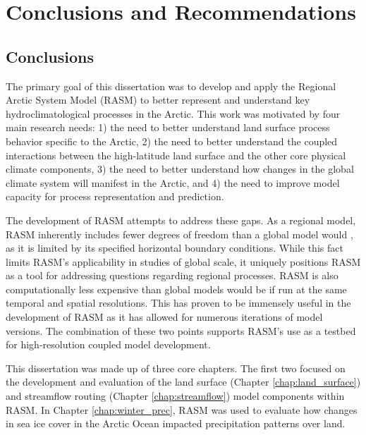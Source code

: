 \chapter{Conclusions and Recommendations}
\label{chap:conclusions}

\section{Conclusions}
The primary goal of this dissertation was to develop and apply the Regional Arctic System Model (RASM) to better represent and understand key hydroclimatological processes in the Arctic.
This work was motivated by four main research needs: 1) the need to better understand land surface process behavior specific to the Arctic, 2) the need to better understand the coupled interactions between the high-latitude land surface and the other core physical climate components, 3) the need to better understand how changes in the global climate system will manifest in the Arctic, and 4) the need to improve model capacity for process representation and prediction.

The development of RASM attempts to address these gaps.
As a regional model, RASM inherently includes fewer degrees of freedom than a global model would \citep[e.g. ][]{Deser_2016}, as it is limited by its specified horizontal boundary conditions.
While this fact limits RASM's applicability in studies of global scale, it uniquely positions RASM as a tool for addressing questions regarding regional processes.
RASM is also computationally less expensive than global models would be if run at the same temporal and spatial resolutions.
This has proven to be immensely useful in the development of RASM as it has allowed for numerous iterations of model versions.
The combination of these two points supports RASM's use as a testbed for high-resolution coupled model development.

This dissertation was made up of three core chapters.
The first two focused on the development and evaluation of the land surface (Chapter \ref{chap:land_surface}) and streamflow routing (Chapter \ref{chap:streamflow}) model components within RASM.
In Chapter \ref{chap:winter_prec}, RASM was used to evaluate how changes in sea ice cover in the Arctic Ocean impacted precipitation patterns over land.


